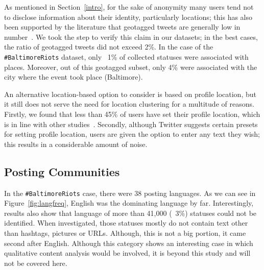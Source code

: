 \documentclass[conference]{IEEEtran}
\begin{document}
As mentioned in Section~\ref{intro}, for the sake of anonymity many
users tend not to disclose information about their identity,
particularly locations; this has also been supported by the literature
that geotagged tweets are generally low in
number~\cite{kang-et-al:2013}. We took the step to verify this claim
in our datasets; in the best cases, the ratio of geotagged tweets did
not exceed 2\%. In the case of the {\texttt{\#BaltimoreRiots}}
dataset, only ~1\% of collected statuses were associated with
places. Moreover, out of this geotagged subset, only 4\% were
associated with the city where the event took place (Baltimore).

An alternative location-based option to consider is based on profile
location, but it still does not serve the need for location clustering
for a multitude of reasons. Firstly, we found that less than 45\% of
users have set their profile location, which is in line with other
studies~\cite{graham-et-al:2014}. Secondly, although Twitter suggests
certain presets for setting profile location, users are given the
option to enter any text they wish; this results in a considerable
amount of noise.

\subsection{Posting Communities}

In the {\texttt{\#BaltimoreRiots}} case, there were 38 posting
languages. As we can see in Figure~\ref{fig:langfreq}, English was the
dominating language by far. Interestingly, results also show that
language of more than 41,000 (~3\%) statuses could not be
identified. When investigated, those statuses mostly do not contain
text other than hashtags, pictures or URLs. Although, this is not a
big portion, it came second after English. Although this category
shows an interesting case in which qualitative content analysis would
be involved, it is beyond this study and will not be covered here.
\end{document}
